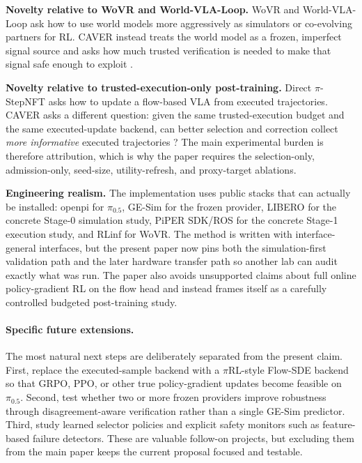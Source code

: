 \documentclass[10pt]{article}
\theoremstyle{plain}
\theoremstyle{definition}
\theoremstyle{remark}
\begin{document}
\textbf{Novelty relative to WoVR and World-VLA-Loop.} WoVR and World-VLA-Loop ask how to use world models more aggressively as simulators or co-evolving partners for RL. CAVER instead treats the world model as a frozen, imperfect signal source and asks how much trusted verification is needed to make that signal safe enough to exploit \citep{jiang2026wovr,liu2026worldvlaloop}.

\textbf{Novelty relative to trusted-execution-only post-training.} Direct $\pi$-StepNFT asks how to update a flow-based VLA from executed trajectories. CAVER asks a different question: given the same trusted-execution budget and the same executed-update backend, can better selection and correction collect \emph{more informative} executed trajectories \citep{wang2026pistepnft}? The main experimental burden is therefore attribution, which is why the paper requires the selection-only, admission-only, seed-size, utility-refresh, and proxy-target ablations.

\textbf{Engineering realism.} The implementation uses public stacks that can actually be installed: openpi for $\pi_{0.5}$, GE-Sim for the frozen provider, LIBERO for the concrete Stage-0 simulation study, PiPER SDK/ROS for the concrete Stage-1 execution study, and RLinf for WoVR. The method is written with interface-general interfaces, but the present paper now pins both the simulation-first validation path and the later hardware transfer path so another lab can audit exactly what was run. The paper also avoids unsupported claims about full online policy-gradient RL on the flow head and instead frames itself as a carefully controlled budgeted post-training study.


\paragraph{Specific future extensions.} The most natural next steps are deliberately separated from the present claim. First, replace the executed-sample backend with a $\pi$RL-style Flow-SDE backend so that GRPO, PPO, or other true policy-gradient updates become feasible on $\pi_{0.5}$. Second, test whether two or more frozen providers improve robustness through disagreement-aware verification rather than a single GE-Sim predictor. Third, study learned selector policies and explicit safety monitors such as feature-based failure detectors. These are valuable follow-on projects, but excluding them from the main paper keeps the current proposal focused and testable.
\end{document}
